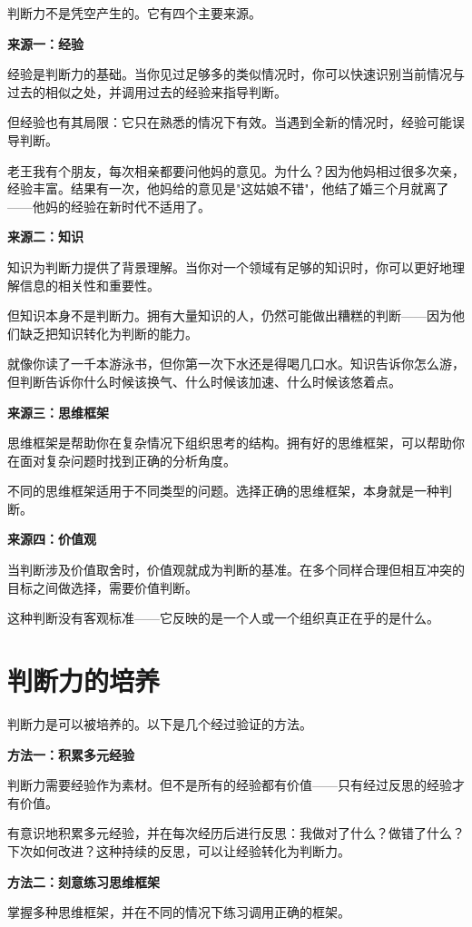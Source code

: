 判断力不是凭空产生的。它有四个主要来源。

\textbf{来源一：经验}

经验是判断力的基础。当你见过足够多的类似情况时，你可以快速识别当前情况与过去的相似之处，并调用过去的经验来指导判断。

但经验也有其局限：它只在熟悉的情况下有效。当遇到全新的情况时，经验可能误导判断。

老王我有个朋友，每次相亲都要问他妈的意见。为什么？因为他妈相过很多次亲，经验丰富。结果有一次，他妈给的意见是"这姑娘不错"，他结了婚三个月就离了——他妈的经验在新时代不适用了。

\textbf{来源二：知识}

知识为判断力提供了背景理解。当你对一个领域有足够的知识时，你可以更好地理解信息的相关性和重要性。

但知识本身不是判断力。拥有大量知识的人，仍然可能做出糟糕的判断——因为他们缺乏把知识转化为判断的能力。

就像你读了一千本游泳书，但你第一次下水还是得喝几口水。知识告诉你怎么游，但判断告诉你什么时候该换气、什么时候该加速、什么时候该悠着点。

\textbf{来源三：思维框架}

思维框架是帮助你在复杂情况下组织思考的结构。拥有好的思维框架，可以帮助你在面对复杂问题时找到正确的分析角度。

不同的思维框架适用于不同类型的问题。选择正确的思维框架，本身就是一种判断。

\textbf{来源四：价值观}

当判断涉及价值取舍时，价值观就成为判断的基准。在多个同样合理但相互冲突的目标之间做选择，需要价值判断。

这种判断没有客观标准——它反映的是一个人或一个组织真正在乎的是什么。

\section{判断力的培养}


判断力是可以被培养的。以下是几个经过验证的方法。

\textbf{方法一：积累多元经验}

判断力需要经验作为素材。但不是所有的经验都有价值——只有经过反思的经验才有价值。

有意识地积累多元经验，并在每次经历后进行反思：我做对了什么？做错了什么？下次如何改进？这种持续的反思，可以让经验转化为判断力。

\textbf{方法二：刻意练习思维框架}

掌握多种思维框架，并在不同的情况下练习调用正确的框架。

